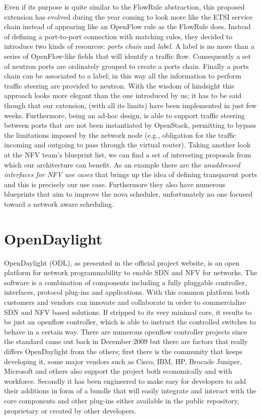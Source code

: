 Even if its purpose is quite similar to the FlowRule abstraction, this proposed extension has evolved during the year coming to look more like the ETSI service chain instead of appearing like an OpenFlow rule as the FlowRule does.
Instead of defining a port-to-port connection with matching rules, they decided to introduce two kinds of resources: \textit{ports chain} and \textit{label}.
A label is no more than a series of OpenFlow-like fields that will identify a traffic flow. Consequently a set of neutron ports are ordinately grouped to create a ports chain.
Finally a ports chain can be associated to a label; in this way all the information to perform traffic steering are provided to neutron.
With the wisdom of hindsight this approach looks more elegant than the one introduced by us; it has to be said though that our extension, (with all its limits) have been implemented in just few weeks. Furthermore, being an ad-hoc design, is able to support traffic steering between ports that are not been instantiated by OpenStack, permitting to bypass the limitations imposed by the network node (e.g., obligation for the traffic incoming and outgoing to pass through the virtual router).
Taking another look at the NFV team's blueprint list, we can find a set of interesting proposals from which our architecture can benefit. As an example there are the \textit{unaddressed interfaces for NFV use cases} that brings up the idea of defining transparent ports and this is precisely our use case.
Furthermore they also have numerous blueprints that aim to improve the nova scheduler, unfortunately no one focused toward a network aware scheduling.

\section{OpenDaylight}
\label{sec:opendaylight}
OpenDaylight (ODL), as presented in the official project website\cite{Opendaylightwebsite}, is an open platform for network programmability to enable SDN and NFV for networks.
The software is a combination of components including a fully pluggable controller, interfaces, protocol plug-ins and applications. With this common platform both customers and vendors can innovate and collaborate in order to commercialize SDN and NFV based solutions.
If stripped to its very minimal core, it results to be just an openflow controller, which is able to instruct the controlled switches to behave in a certain way.
There are numerous openflow controller projects since the standard came out back in December 2009 but there are factors that really differs OpenDaylight from the others; first there is the community that keeps developing it, some major vendors such as Cisco, IBM, HP, Brocade Juniper, Microsoft and others also support the project both economically and with workforce.
Secondly it has been engineered to make easy for developers to add their additions in form of a bundle that will easily integrate and interact with the core components and other plug-ins either available in the public repository, proprietary or created by other developers.


